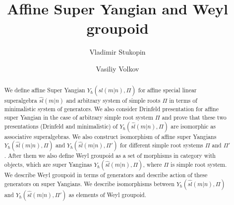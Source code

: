 \documentclass[english]{elsarticle}
\title{Affine Super Yangian and Weyl groupoid}
\author{Vladimir Stukopin}
\author{Vasiliy Volkov}
\numberwithin{equation}{section}
\begin{document}
\begin{abstract}
We define affine Super Yangian $Y_{\hbar}(\hat{sl}(m|n), \Pi) $ for affine special linear superalgebra $\hat{sl}(m|n)$ and arbitrary system of simple roots $\Pi$ in terms of minimalistic system of generators. We also consider Drinfeld presentation for affine super Yangian in the case of arbitrary simple root system $\Pi$ and prove that these two presentations (Drinfeld and minimalistic) of $Y_{\hbar}(\hat{sl}(m|n), \Pi)$ are isomorphic as associative superalgebras.  We also construct isomorphism of affine super Yangians $Y_{\hbar}(\hat{sl}(m|n), \Pi)$ and $Y_{\hbar}(\hat{sl}(m|n), \Pi')$ for different simple root systems $\Pi$ and $\Pi'$. After them we also define Weyl groupoid as a set of morphisms in category with objects, which are super Yanginas $Y_{\hbar}(\hat{sl}(m|n), \Pi)$, where $\Pi$ is simple root system. We describe Weyl groupoid in terms of generators and describe action of these generators on super Yangians. We describe isomorphisms between $Y_{\hbar}(\hat{sl}(m|n), \Pi)$ and $Y_{\hbar}(\hat{sl}(m|n), \Pi')$ as elements of Weyl groupoid.
\end{abstract}








\maketitle

\end{document}
